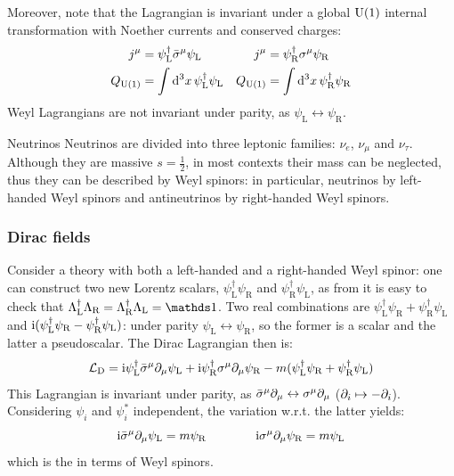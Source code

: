 Moreover, note that the Lagrangian is invariant under a global $ \mathrm{U}(1) $ internal transformation with Noether currents and conserved charges:
\begin{align*}
  j^\mu &= \psi_\text{L}^\dagger \bar{\sigma}^\mu \psi_\text{L} & j^\mu &= \psi_\text{R}^\dagger \sigma^\mu \psi_\text{R} \\
  Q_{\mathrm{U}(1)} &= \int \mathrm{d}^3x\, \psi_\text{L}^\dagger \psi_\text{L} & Q_{\mathrm{U}(1)} &= \int \mathrm{d}^3x\, \psi_\text{R}^\dagger \psi_\text{R}
\end{align*}
Weyl Lagrangians are not invariant under parity, as $ \psi_\text{L} \leftrightarrow \psi_\text{R} $.

\begin{example}{Neutrinos}{}
  Neutrinos are divided into three leptonic families: $ \nu_e $, $ \nu_\mu $ and $ \nu_\tau $. Although they are massive $ s = \frac{1}{2} $, in most contexts their mass can be neglected, thus they can be described by Weyl spinors: in particular, neutrinos by left-handed Weyl spinors and antineutrinos by right-handed Weyl spinors.
\end{example}

\subsubsection{Dirac fields}

Consider a theory with both a left-handed and a right-handed Weyl spinor: one can construct two new Lorentz scalars, $ \psi_\text{L}^\dagger \psi_\text{R} $ and $ \psi_\text{R}^\dagger \psi_\text{L} $, as from  it is easy to check that $ \Lambda_\text{L}^\dagger \Lambda_\text{R} = \Lambda_\text{R}^\dagger \Lambda_\text{L} = \id $. Two real combinations are $ \psi_\text{L}^\dagger \psi_\text{R} + \psi_\text{R}^\dagger \psi_\text{L} $ and $ \mathrm{i} (\psi_\text{L}^\dagger \psi_\text{R} - \psi_\text{R}^\dagger \psi_\text{L}) $: under parity $ \psi_\text{L} \leftrightarrow \psi_\text{R} $, so the former is a scalar and the latter a pseudoscalar. The Dirac Lagrangian then is:
\begin{equation}
  \mathcal{L}_\text{D} = \mathrm{i} \psi_\text{L}^\dagger \bar{\sigma}^\mu \partial_\mu \psi_\text{L} + \mathrm{i} \psi_\text{R}^\dagger \sigma^\mu \partial_\mu \psi_\text{R} - m ( \psi_\text{L}^\dagger \psi_\text{R} + \psi_\text{R}^\dagger \psi_\text{L} )
\end{equation}
This Lagrangian is invariant under parity, as $ \bar{\sigma}^\mu \partial_\mu \leftrightarrow \sigma^\mu \partial_\mu $ ($ \partial_i \mapsto - \partial_i $). Considering $ \psi_i $ and $ \psi_i^* $ independent, the variation w.r.t. the latter yields:
\begin{equation}
  \mathrm{i} \bar{\sigma}^\mu \partial_\mu \psi_\text{L} = m \psi_\text{R}
  \qquad \qquad
  \mathrm{i} \sigma^\mu \partial_\mu \psi_\text{R} = m \psi_\text{L}
\end{equation}
which is the  in terms of Weyl spinors.

